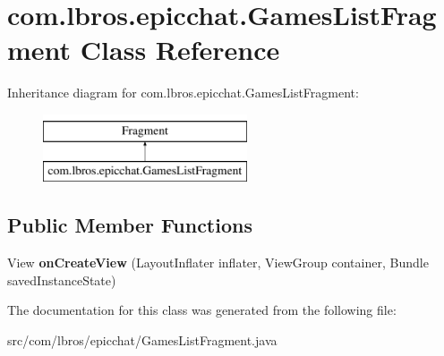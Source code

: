 \hypertarget{classcom_1_1lbros_1_1epicchat_1_1_games_list_fragment}{\section{com.\-lbros.\-epicchat.\-Games\-List\-Fragment Class Reference}
\label{classcom_1_1lbros_1_1epicchat_1_1_games_list_fragment}
}
Inheritance diagram for com.\-lbros.\-epicchat.\-Games\-List\-Fragment\-:\begin{figure}[H]
\begin{center}
\leavevmode
\includegraphics[height=2.000000cm]{classcom_1_1lbros_1_1epicchat_1_1_games_list_fragment}
\end{center}
\end{figure}
\subsection*{Public Member Functions}
\begin{DoxyCompactItemize}
\item 
\hypertarget{classcom_1_1lbros_1_1epicchat_1_1_games_list_fragment_a5b309e413612f4b9c0dcf365d50d016b}{View {\bfseries on\-Create\-View} (Layout\-Inflater inflater, View\-Group container, Bundle saved\-Instance\-State)}\label{classcom_1_1lbros_1_1epicchat_1_1_games_list_fragment_a5b309e413612f4b9c0dcf365d50d016b}

\end{DoxyCompactItemize}


The documentation for this class was generated from the following file\-:\begin{DoxyCompactItemize}
\item 
src/com/lbros/epicchat/Games\-List\-Fragment.\-java\end{DoxyCompactItemize}
